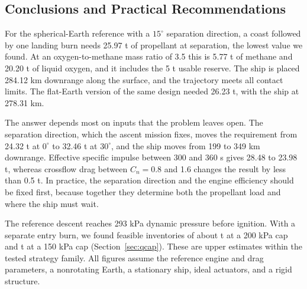 \documentclass[12pt,a4paper]{article}
\begin{document}
\subsection{Conclusions and Practical Recommendations}
For the spherical-Earth reference with a $15^\circ$ separation direction, a coast followed by one landing burn needs 25.97 t of propellant at separation, the lowest value we found. At an oxygen-to-methane mass ratio of 3.5 this is 5.77 t of methane and 20.20 t of liquid oxygen, and it includes the 5 t usable reserve. The ship is placed 284.12 km downrange along the surface, and the trajectory meets all contact limits. The flat-Earth version of the same design needed 26.23 t, with the ship at 278.31 km.

The answer depends most on inputs that the problem leaves open. The separation direction, which the ascent mission fixes, moves the requirement from 24.32 t at $0^\circ$ to 32.46 t at $30^\circ$, and the ship moves from 199 to 349 km downrange. Effective specific impulse between 300 and 360 s gives 28.48 to 23.98 t, whereas crossflow drag between $C_n=0.8$ and 1.6 changes the result by less than 0.5 t. In practice, the separation direction and the engine efficiency should be fixed first, because together they determine both the propellant load and where the ship must wait.

The reference descent reaches 293 kPa dynamic pressure before ignition. With a separate entry burn, we found feasible inventories of about \QcapTwoHundred{} t at a 200 kPa cap and \QcapOneFifty{} t at a 150 kPa cap (Section~\ref{sec:qcap}). These are upper estimates within the tested strategy family. All figures assume the reference engine and drag parameters, a nonrotating Earth, a stationary ship, ideal actuators, and a rigid structure.
\end{document}
